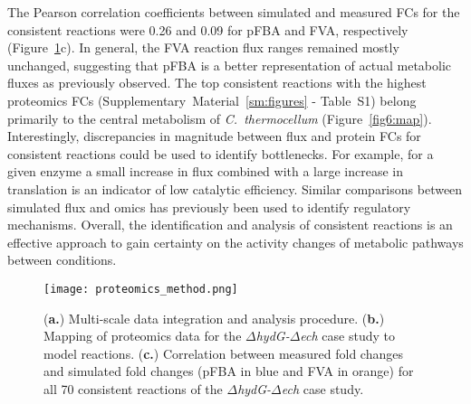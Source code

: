 The Pearson correlation coefficients between simulated and measured FCs for the consistent reactions were 0.26 and 0.09 for pFBA and FVA, respectively (Figure~\ref{fig6:proteomics}c).
In general, the FVA reaction flux ranges remained mostly unchanged, suggesting that pFBA is a better representation of actual metabolic fluxes as previously observed.\citep{machado2014}
The top consistent reactions with the highest proteomics FCs (Supplementary~Material~\ref{sm:figures} - Table~S1) belong primarily to the central metabolism of \textit{C.~thermocellum} (Figure~\ref{fig6:map}).
Interestingly, discrepancies in magnitude between flux and protein FCs for consistent reactions could be used to identify bottlenecks.
For example, for a given enzyme a small increase in flux combined with a large increase in translation is an indicator of low catalytic efficiency.
Similar comparisons between simulated flux and omics has previously been used to identify regulatory mechanisms.\citep{bordel2010}
Overall, the identification and analysis of consistent reactions is an effective approach to gain certainty on the activity changes of metabolic pathways between conditions.

\begin{figure}[hp]
    \centering
    \texttt{[image: proteomics\_method.png]}
    \caption[Multi-scale data integration procedure]{(\textbf{a.}) Multi-scale data integration and analysis procedure. (\textbf{b.}) Mapping of proteomics data for the \textit{$\Delta$hydG-$\Delta$ech} case study to model reactions. (\textbf{c.}) Correlation between measured fold changes and simulated fold changes (pFBA in blue and FVA in orange) for all 70 consistent reactions of the \textit{$\Delta$hydG-$\Delta$ech} case study.}
    \label{fig6:proteomics}
\end{figure}


